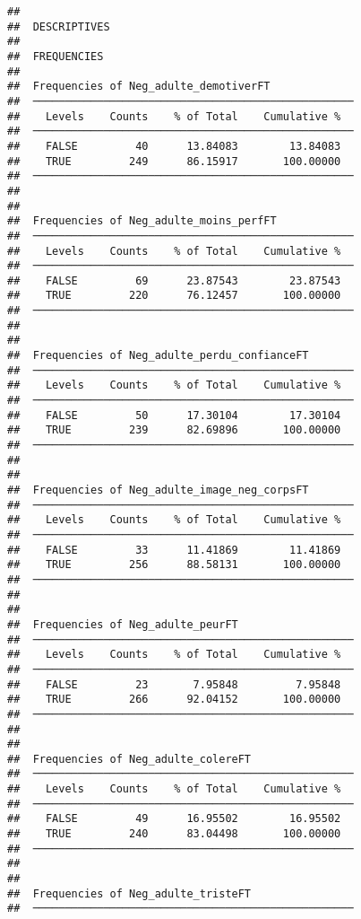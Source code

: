 \documentclass[
]{article}
\begin{document}
\begin{verbatim}
## 
##  DESCRIPTIVES
## 
##  FREQUENCIES
## 
##  Frequencies of Neg_adulte_demotiverFT              
##  ────────────────────────────────────────────────── 
##    Levels    Counts    % of Total    Cumulative %   
##  ────────────────────────────────────────────────── 
##    FALSE         40      13.84083        13.84083   
##    TRUE         249      86.15917       100.00000   
##  ────────────────────────────────────────────────── 
## 
## 
##  Frequencies of Neg_adulte_moins_perfFT             
##  ────────────────────────────────────────────────── 
##    Levels    Counts    % of Total    Cumulative %   
##  ────────────────────────────────────────────────── 
##    FALSE         69      23.87543        23.87543   
##    TRUE         220      76.12457       100.00000   
##  ────────────────────────────────────────────────── 
## 
## 
##  Frequencies of Neg_adulte_perdu_confianceFT        
##  ────────────────────────────────────────────────── 
##    Levels    Counts    % of Total    Cumulative %   
##  ────────────────────────────────────────────────── 
##    FALSE         50      17.30104        17.30104   
##    TRUE         239      82.69896       100.00000   
##  ────────────────────────────────────────────────── 
## 
## 
##  Frequencies of Neg_adulte_image_neg_corpsFT        
##  ────────────────────────────────────────────────── 
##    Levels    Counts    % of Total    Cumulative %   
##  ────────────────────────────────────────────────── 
##    FALSE         33      11.41869        11.41869   
##    TRUE         256      88.58131       100.00000   
##  ────────────────────────────────────────────────── 
## 
## 
##  Frequencies of Neg_adulte_peurFT                   
##  ────────────────────────────────────────────────── 
##    Levels    Counts    % of Total    Cumulative %   
##  ────────────────────────────────────────────────── 
##    FALSE         23       7.95848         7.95848   
##    TRUE         266      92.04152       100.00000   
##  ────────────────────────────────────────────────── 
## 
## 
##  Frequencies of Neg_adulte_colereFT                 
##  ────────────────────────────────────────────────── 
##    Levels    Counts    % of Total    Cumulative %   
##  ────────────────────────────────────────────────── 
##    FALSE         49      16.95502        16.95502   
##    TRUE         240      83.04498       100.00000   
##  ────────────────────────────────────────────────── 
## 
## 
##  Frequencies of Neg_adulte_tristeFT                 
##  ────────────────────────────────────────────────── 

\end{verbatim}
\end{document}
